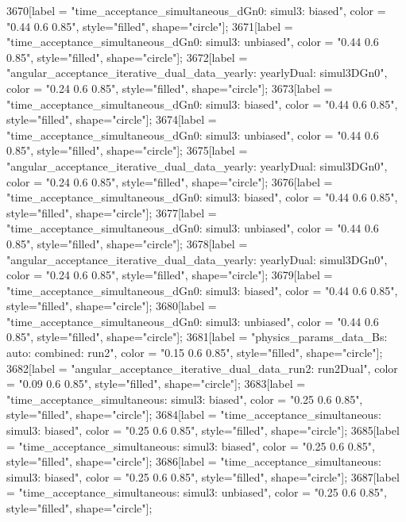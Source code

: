 {	3670[label = "time_acceptance_simultaneous_dGn0\ntimeacc: simul3\ntrigger: biased", color = "0.44 0.6 0.85", style="filled", shape="circle"];
	3671[label = "time_acceptance_simultaneous_dGn0\ntimeacc: simul3\ntrigger: unbiased", color = "0.44 0.6 0.85", style="filled", shape="circle"];
	3672[label = "angular_acceptance_iterative_dual_data_yearly\nangacc: yearlyDual\ntimeacc: simul3DGn0", color = "0.24 0.6 0.85", style="filled", shape="circle"];
	3673[label = "time_acceptance_simultaneous_dGn0\ntimeacc: simul3\ntrigger: biased", color = "0.44 0.6 0.85", style="filled", shape="circle"];
	3674[label = "time_acceptance_simultaneous_dGn0\ntimeacc: simul3\ntrigger: unbiased", color = "0.44 0.6 0.85", style="filled", shape="circle"];
	3675[label = "angular_acceptance_iterative_dual_data_yearly\nangacc: yearlyDual\ntimeacc: simul3DGn0", color = "0.24 0.6 0.85", style="filled", shape="circle"];
	3676[label = "time_acceptance_simultaneous_dGn0\ntimeacc: simul3\ntrigger: biased", color = "0.44 0.6 0.85", style="filled", shape="circle"];
	3677[label = "time_acceptance_simultaneous_dGn0\ntimeacc: simul3\ntrigger: unbiased", color = "0.44 0.6 0.85", style="filled", shape="circle"];
	3678[label = "angular_acceptance_iterative_dual_data_yearly\nangacc: yearlyDual\ntimeacc: simul3DGn0", color = "0.24 0.6 0.85", style="filled", shape="circle"];
	3679[label = "time_acceptance_simultaneous_dGn0\ntimeacc: simul3\ntrigger: biased", color = "0.44 0.6 0.85", style="filled", shape="circle"];
	3680[label = "time_acceptance_simultaneous_dGn0\ntimeacc: simul3\ntrigger: unbiased", color = "0.44 0.6 0.85", style="filled", shape="circle"];
	3681[label = "physics_params_data_Bs\nfit: auto\ntrigger: combined\nyear: run2", color = "0.15 0.6 0.85", style="filled", shape="circle"];
	3682[label = "angular_acceptance_iterative_dual_data_run2\nangacc: run2Dual", color = "0.09 0.6 0.85", style="filled", shape="circle"];
	3683[label = "time_acceptance_simultaneous\ntimeacc: simul3\ntrigger: biased", color = "0.25 0.6 0.85", style="filled", shape="circle"];
	3684[label = "time_acceptance_simultaneous\ntimeacc: simul3\ntrigger: biased", color = "0.25 0.6 0.85", style="filled", shape="circle"];
	3685[label = "time_acceptance_simultaneous\ntimeacc: simul3\ntrigger: biased", color = "0.25 0.6 0.85", style="filled", shape="circle"];
	3686[label = "time_acceptance_simultaneous\ntimeacc: simul3\ntrigger: biased", color = "0.25 0.6 0.85", style="filled", shape="circle"];
	3687[label = "time_acceptance_simultaneous\ntimeacc: simul3\ntrigger: unbiased", color = "0.25 0.6 0.85", style="filled", shape="circle"];
}
